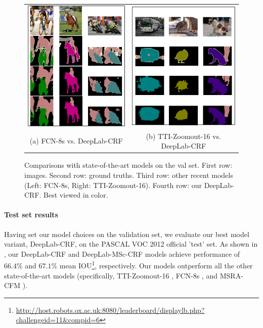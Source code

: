\begin{figure}[t]
  \centering
  \begin{tabular}{c c}
    \includegraphics[height=0.55\linewidth]{fig/comparedWithFCN.pdf} &
    \includegraphics[height=0.55\linewidth]{fig/comparedWithRoomOut.pdf} \\
    (a) FCN-8s vs. DeepLab-CRF & (b) TTI-Zoomout-16 vs. DeepLab-CRF \\
  \end{tabular}
  \caption{Comparisons with state-of-the-art models on the val set. First row: images. Second row: ground truths. Third row: other recent models (Left: FCN-8s, Right: TTI-Zoomout-16). Fourth row: our DeepLab-CRF. Best viewed in color.}
  \label{fig:val_comparison}
\end{figure}


\paragraph{Test set results} Having set our model choices on the validation set, we evaluate our best model variant, DeepLab-CRF, on the PASCAL VOC 2012 official 'test' set.  As shown in , our DeepLab-CRF and DeepLab-MSc-CRF models achieve performance of $66.4\%$ and $67.1\%$ mean IOU\footnote{\url{http://host.robots.ox.ac.uk:8080/leaderboard/displaylb.php?challengeid=11&compid=6}}, respectively. Our models outperform all the other state-of-the-art models (specifically, TTI-Zoomout-16 \citep{mostajabi2014feedforward}, FCN-8s \citep{long2014fully}, and MSRA-CFM \citep{dai2014convolutional}).

